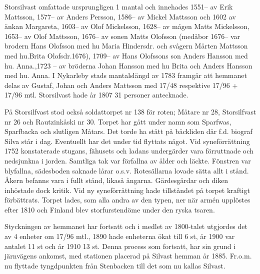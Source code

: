 Storsilvast omfattade ursprungligen 1 mantal och innehades 1551-- av Erik Mattsson, 1577-- av Anders Persson, 1586-- av Mickel Mattsson och 1602 av änkan Margareta, 1603-- av Olof Mickelsson, 1628-- av mågen Matts Mickelsson, 1653-- av Olof Mattsson, 1676-- av sonen Matts Olofsson (medåbor 1676-- var brodern Hans Olofsson med hu Maria Hindersdr. och svågern Mårten Mattsson med hu.Brita Olofsdr.1676), 1709-- av Hans Olofssons son Anders Hansson med hu. Anna.,1723 – av bröderna Johan Hansson med hu Brita och Anders Hansson med hu. Anna.  I Nykarleby stads mantalslängd av 1783 framgår att hemmanet delas av Gustaf, Johan	och Anders Mattsson med 17/48 respektive 17/96 + 17/96 mtl. Storsilvast hade år 1807 31 personer antecknade.

På Storsilfvast stod också soldattorpet nr 138 för roten; Måtare nr 28, Storsilfvast nr 26 och Rautzinkåski nr 30. Torpet har gått under namn som Sparfwas, Sparfbacka och slutligen Måtars. Det torde ha stått på bäckliden där f.d. biograf Silva står i dag. Eventuellt har det under tid flyttats något. Vid syneförrättning 1752 konstaterade stugans, fähusets och ladans undergärder vara förruttnade och nedsjunkna i jorden. Samtliga tak var förfallna av ålder och läckte. Fönstren var blyfallna, sädesboden saknade lårar o.s.v. Rotesällarna lovade sätta allt i stånd. Åkern befanns vara i fullt stånd, likaså ängarna. Gärdesgårdar och diken inhöstade dock kritik. Vid ny syneförrättning hade tillståndet på torpet kraftigt förbättrats. Torpet lades, som alla andra av den typen, ner när armén upplöstes efter 1810 och Finland blev storfurstendöme under den ryska tsaren.

Styckningen av hemmanet har fortsatt och i medlet av 1800-talet utgjordes det av 4 enheter om 17/96 mtl., 1890 hade enheterna ökat till 6 st, år 1900 var antalet 11 st och år 1910 13 st. Denna process som fortsatt, har sin grund i järnvägens ankomst, med stationen placerad på Silvast hemman år 1885. Fr.o.m. nu flyttade tyngdpunkten från Stenbacken till det som nu kallas Silvast.

